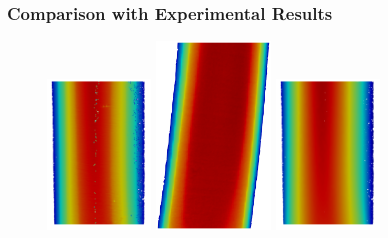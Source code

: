 \subsubsection*{Comparison with Experimental Results}

\begin{figure}
\begin{minipage}[c][9.5cm][c]{0.28\textwidth}
\centering
\vspace*{\fill}
\includegraphics[height=4cm]{imgs/vena_cava/PIV_coronal_rest.png}

\addtocounter{subfigure}{1}
\includegraphics[height=5cm]{imgs/vena_cava/PIV_sagittal_rest.png}
\end{minipage}
\begin{minipage}[c][9.5cm][c]{0.28\textwidth}
\centering
\vspace*{\fill}
\includegraphics[height=4cm]{imgs/vena_cava/FEM_coronal_rest.png}


\end{minipage}
\end{figure}
